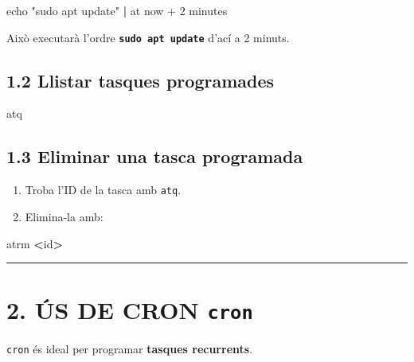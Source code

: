 \documentclass[
  12 pt,
  a4paper,
]{article}
\newenvironment{Shaded}{\begin{snugshade}}{\end{snugshade}}
\newcommand{\BuiltInTok}[1]{#1}
\newcommand{\ExtensionTok}[1]{#1}
\newcommand{\KeywordTok}[1]{\textcolor[rgb]{0.13,0.29,0.53}{\textbf{#1}}}
\newcommand{\NormalTok}[1]{#1}
\newcommand{\OperatorTok}[1]{\textcolor[rgb]{0.81,0.36,0.00}{\textbf{#1}}}
\newcommand{\StringTok}[1]{\textcolor[rgb]{0.31,0.60,0.02}{#1}}
\begin{document}
\begin{Shaded}
\begin{Highlighting}[]
\BuiltInTok{echo} \StringTok{"sudo apt update"} \KeywordTok{|} \ExtensionTok{at}\NormalTok{ now + 2 minutes}
\end{Highlighting}
\end{Shaded}

Això executarà l'ordre \textbf{\texttt{sudo\ apt\ update}} d'ací a 2
minuts.

\subsection{1.2 Llistar tasques
programades}\label{llistar-tasques-programades}

\begin{Shaded}
\begin{Highlighting}[]
\ExtensionTok{atq}
\end{Highlighting}
\end{Shaded}

\subsection{1.3 Eliminar una tasca
programada}\label{eliminar-una-tasca-programada}

\begin{enumerate}
\def\labelenumi{\arabic{enumi}.}
\item
  Troba l'ID de la tasca amb \texttt{atq}.
\item
  Elimina-la amb:
\end{enumerate}

\begin{Shaded}
\begin{Highlighting}[]
\ExtensionTok{atrm} \OperatorTok{\textless{}}\NormalTok{id}\OperatorTok{\textgreater{}}
\end{Highlighting}
\end{Shaded}

\begin{center}\rule{0.5\linewidth}{0.5pt}\end{center}

\section{\texorpdfstring{2. ÚS DE CRON
\texttt{cron}}{2. ÚS DE CRON cron}}\label{uxfas-de-cron-cron}

\texttt{cron} és ideal per programar \textbf{tasques recurrents}.
\end{document}

